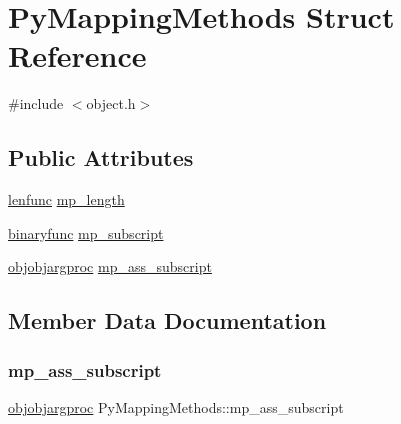 \hypertarget{struct_py_mapping_methods}{}\section{Py\+Mapping\+Methods Struct Reference}
\label{struct_py_mapping_methods}


{\ttfamily \#include $<$object.\+h$>$}

\subsection*{Public Attributes}
\begin{DoxyCompactItemize}
\item 
\mbox{\hyperlink{_python27_2object_8h_a07099ee62617991d223a386bb7f09008}{lenfunc}} \mbox{\hyperlink{struct_py_mapping_methods_a7b02ebb6c6da74a7a12f5edddd43da8c}{mp\+\_\+length}}
\item 
\mbox{\hyperlink{_python27_2object_8h_a1a50b2d154f36acb9d215f2cdc1561a8}{binaryfunc}} \mbox{\hyperlink{struct_py_mapping_methods_acbf54a190e71b3ad665a1df1e26b1384}{mp\+\_\+subscript}}
\item 
\mbox{\hyperlink{_python27_2object_8h_ac98f9df50e08c244bc28b5758f8bbf46}{objobjargproc}} \mbox{\hyperlink{struct_py_mapping_methods_a8f2bf86d305c7d83a9c601204efa3841}{mp\+\_\+ass\+\_\+subscript}}
\end{DoxyCompactItemize}


\subsection{Member Data Documentation}
\mbox{\label{struct_py_mapping_methods_a8f2bf86d305c7d83a9c601204efa3841}} 
\subsubsection{\texorpdfstring{mp\_ass\_subscript}{mp\_ass\_subscript}}
{\footnotesize\ttfamily \mbox{\hyperlink{_python27_2object_8h_ac98f9df50e08c244bc28b5758f8bbf46}{objobjargproc}} Py\+Mapping\+Methods\+::mp\+\_\+ass\+\_\+subscript}

\mbox{\label{struct_py_mapping_methods_a7b02ebb6c6da74a7a12f5edddd43da8c}} 
